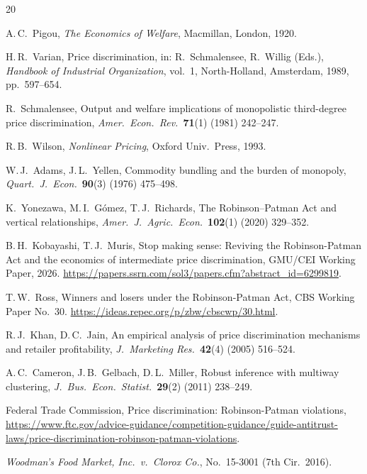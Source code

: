 \documentclass[11pt,a4paper]{article}
\theoremstyle{plain}
\theoremstyle{definition}
\theoremstyle{remark}
\begin{document}
\begin{thebibliography}{20}

A.\,C.~Pigou,
\textit{The Economics of Welfare},
Macmillan, London, 1920.

H.\,R.~Varian,
Price discrimination,
in: R.~Schmalensee, R.~Willig (Eds.), \textit{Handbook of Industrial Organization}, vol.~1,
North-Holland, Amsterdam, 1989, pp.~597--654.

R.~Schmalensee,
Output and welfare implications of monopolistic third-degree price discrimination,
\textit{Amer.\ Econ.\ Rev.}\ \textbf{71}(1) (1981) 242--247.

R.\,B.~Wilson,
\textit{Nonlinear Pricing},
Oxford Univ.\ Press, 1993.

W.\,J.~Adams, J.\,L.~Yellen,
Commodity bundling and the burden of monopoly,
\textit{Quart.\ J.\ Econ.}\ \textbf{90}(3) (1976) 475--498.

K.~Yonezawa, M.\,I.~G\'omez, T.\,J.~Richards,
The Robinson--Patman Act and vertical relationships,
\textit{Amer.\ J.\ Agric.\ Econ.}\ \textbf{102}(1) (2020) 329--352.

B.\,H.~Kobayashi, T.\,J.~Muris,
Stop making sense: Reviving the Robinson-Patman Act and the economics of intermediate price discrimination,
GMU/CEI Working Paper, 2026.
\url{https://papers.ssrn.com/sol3/papers.cfm?abstract_id=6299819}.

T.\,W.~Ross,
Winners and losers under the Robinson-Patman Act,
CBS Working Paper No.~30.
\url{https://ideas.repec.org/p/zbw/cbscwp/30.html}.

R.\,J.~Khan, D.\,C.~Jain,
An empirical analysis of price discrimination mechanisms and retailer profitability,
\textit{J.\ Marketing Res.}\ \textbf{42}(4) (2005) 516--524.

A.\,C.~Cameron, J.\,B.~Gelbach, D.\,L.~Miller,
Robust inference with multiway clustering,
\textit{J.\ Bus.\ Econ.\ Statist.}\ \textbf{29}(2) (2011) 238--249.

Federal Trade Commission,
Price discrimination: Robinson-Patman violations,
\url{https://www.ftc.gov/advice-guidance/competition-guidance/guide-antitrust-laws/price-discrimination-robinson-patman-violations}.

\textit{Woodman's Food Market, Inc.\ v.\ Clorox Co.}, No.~15-3001 (7th Cir.\ 2016).


\end{thebibliography}
\end{document}

